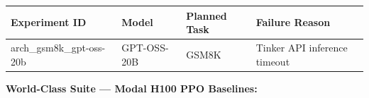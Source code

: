 \documentclass[
  american,
  11pt,
  a4paper,
  oneside]{report}
\newcounter{none} %
\begin{document}
{\def\LTcaptype{none} %
\begin{longtable}[]{@{}
  >{\raggedright\arraybackslash}p{}
  >{\raggedright\arraybackslash}p{}
  >{\raggedright\arraybackslash}p{}
  >{\raggedright\arraybackslash}p{}@{}}
\toprule\noalign{}
\begin{minipage}[b]{\linewidth}\raggedright
Experiment ID
\end{minipage} & \begin{minipage}[b]{\linewidth}\raggedright
Model
\end{minipage} & \begin{minipage}[b]{\linewidth}\raggedright
Planned Task
\end{minipage} & \begin{minipage}[b]{\linewidth}\raggedright
Failure Reason
\end{minipage} \\
\midrule\noalign{}
\endhead
\bottomrule\noalign{}
\endlastfoot
arch\_gsm8k\_gpt-oss-20b & GPT-OSS-20B & GSM8K & Tinker API inference
timeout \\
\end{longtable}
}

\textbf{World-Class Suite --- Modal H100 PPO Baselines:}
\end{document}
